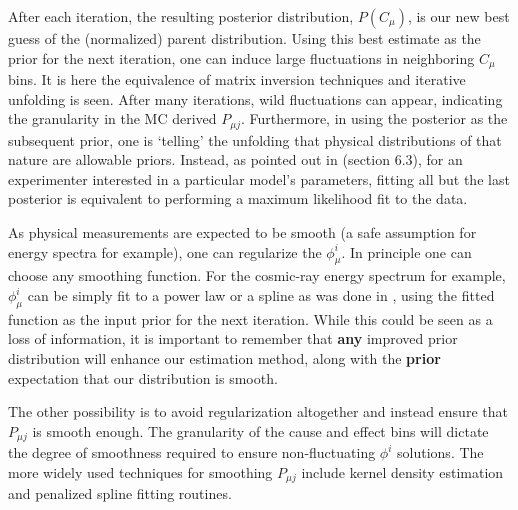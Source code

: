 After each iteration, the resulting posterior distribution, $P(C_{\mu})$, is our new best guess 
of the (normalized) parent distribution. Using this best estimate as the prior for the next iteration,
one can induce large fluctuations in neighboring $C_{\mu}$ bins. It is here the equivalence of matrix inversion
techniques and iterative unfolding is seen. After many iterations, wild fluctuations can appear, indicating
the granularity in the MC derived $P_{\mu j}$. Furthermore, in using the posterior as the subsequent prior, 
one is `telling' the unfolding that physical distributions of that nature are allowable priors. Instead, as pointed
out in \cite{agostini} (section 6.3), for an experimenter interested in a particular model's parameters, 
fitting all but the last posterior is equivalent to performing a maximum likelihood fit to the data. 

As physical measurements are expected to be smooth (a safe assumption for energy spectra for example), 
one can regularize the $\phi^{i}_{\mu}$. In principle one can choose any smoothing function. 
For the cosmic-ray energy spectrum for example, $\phi^{i}_{\mu}$ can be simply fit to a power law or a spline
as was done in \cite{hawc-cr-spectrum}, using the fitted function as the input prior for the next iteration. 
While this could be seen as a loss of information, it is important to remember that \textbf{any} improved prior 
distribution will enhance our estimation method, along with the \textbf{prior} expectation that our distribution is smooth.

The other possibility is to avoid regularization altogether and instead ensure that $P_{\mu j}$
is smooth enough. The granularity of the cause and effect bins will dictate the degree of smoothness 
required to ensure non-fluctuating $\phi^{i}$ solutions. The more widely used techniques for smoothing 
$P_{\mu j}$ include kernel density estimation and penalized spline fitting routines.
